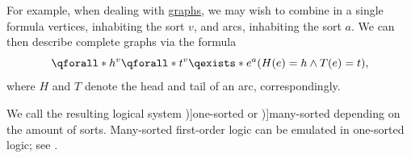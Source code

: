\begin{concept}
\begin{thmenum}
    For example, when dealing with \hyperref[rem:graph_of_unspecified_type]{graphs}, we may wish to combine in a single formula vertices, inhabiting the sort \( v \), and arcs, inhabiting the sort \( a \). We can then describe complete graphs via the formula
    \begin{equation*}
      \qforall* {h^v} \qforall* {t^v} \qexists* {e^a} (H(e) = h \wedge T(e) = t),
    \end{equation*}
    where \( H \) and \( T \) denote the head and tail of an arc, correspondingly.

    We call the resulting logical system \term[en=one-sorted (predicate calculus) (\cite[84]{Kleene2002Logic})]{one-sorted} or \term[en=many-sorted predicate logic (\cite[\S 4.4.13]{TroelstraSchwichtenberg2000BasicProofTheory})]{many-sorted} depending on the amount of sorts. Many-sorted first-order logic can be emulated in one-sorted logic; see .
  \end{thmenum}
\end{concept}

